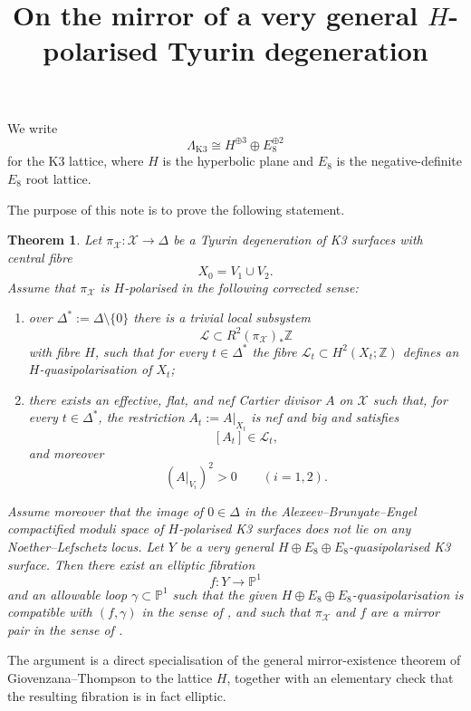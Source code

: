 \documentclass[11pt]{article}
\newtheorem{theorem}{Theorem}
\newcommand{\PP}{\mathbb{P}}
\newcommand{\ZZ}{\mathbb{Z}}
\begin{document}
\title{On the mirror of a very general $H$-polarised Tyurin degeneration}
\author{}
\date{}
\maketitle

We write
\[
\Lambda_{\mathrm{K3}} \cong H^{\oplus 3}\oplus E_8^{\oplus 2}
\]
for the K3 lattice, where $H$ is the hyperbolic plane and $E_8$ is the negative-definite $E_8$ root lattice.

The purpose of this note is to prove the following statement.

\begin{theorem}\label{thm:main}
Let $\pi_{\mathcal X}\colon \mathcal X\to \Delta$ be a Tyurin degeneration of K3 surfaces with central fibre
\[
X_0=V_1\cup V_2.
\]
Assume that $\pi_{\mathcal X}$ is $H$-polarised in the following corrected sense:
\begin{enumerate}
\item over $\Delta^*:=\Delta\setminus\{0\}$ there is a trivial local subsystem
\[
\mathcal L\subset R^2(\pi_{\mathcal X})_*\ZZ
\]
with fibre $H$, such that for every $t\in \Delta^*$ the fibre $\mathcal L_t\subset H^2(X_t;\ZZ)$ defines an $H$-quasipolarisation of $X_t$;

\item there exists an effective, flat, and nef Cartier divisor $A$ on $\mathcal X$ such that, for every $t\in \Delta^*$, the restriction $A_t:=A|_{X_t}$ is nef and big and satisfies
\[
[A_t]\in \mathcal L_t,
\]
and moreover
\[
(A|_{V_i})^2>0 \qquad (i=1,2).
\]
\end{enumerate}
Assume moreover that the image of $0\in \Delta$ in the Alexeev--Brunyate--Engel compactified moduli space of $H$-polarised K3 surfaces does not lie on any Noether--Lefschetz locus. Let $Y$ be a very general $H\oplus E_8\oplus E_8$-quasipolarised K3 surface. Then there exist an elliptic fibration
\[
f\colon Y\to \PP^1
\]
and an allowable loop $\gamma\subset \PP^1$ such that the given $H\oplus E_8\oplus E_8$-quasipolarisation is compatible with $(f,\gamma)$ in the sense of \cite[Definition~4.21]{GT24}, and such that $\pi_{\mathcal X}$ and $f$ are a mirror pair in the sense of \cite[Definition~5.1]{GT24}.
\end{theorem}

The argument is a direct specialisation of the general mirror-existence theorem of Giovenzana--Thompson to the lattice $H$, together with an elementary check that the resulting fibration is in fact elliptic.
\end{document}

